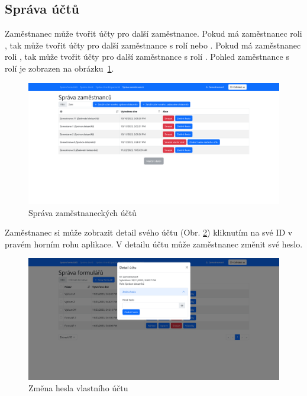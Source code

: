 \subsection{Správa účtů}\label{subsec:sprava-uctu}

Zaměstnanec může tvořit účty pro další zaměstnance.
Pokud má zaměstnanec roli , tak může tvořit účty pro další zaměstnance s rolí  nebo .
Pokud má zaměstnanec roli , tak může tvořit účty pro další zaměstnance s rolí .
Pohled zaměstnance s rolí  je zobrazen na obrázku~\ref{fig:sprava-zamestnancu-screenshot}.

\begin{figure}[H]
    \includegraphics[width=\textwidth]{../img/screenshots/sprava-zamestnancu}
    \caption{Správa zaměstnaneckých účtů}\label{fig:sprava-zamestnancu-screenshot}
\end{figure}

Zaměstnanec si může zobrazit detail svého účtu (Obr. \ref{fig:zmena-hesla-zamestnanec}) kliknutím na své ID v pravém horním rohu aplikace.
V detailu účtu může zaměstnanec změnit své heslo.

\begin{figure}[H]
    \includegraphics[width=\textwidth]{../img/screenshots/zmena-hesla-zamestnanec}
    \caption{Změna hesla vlastního účtu}\label{fig:zmena-hesla-zamestnanec}
\end{figure}


